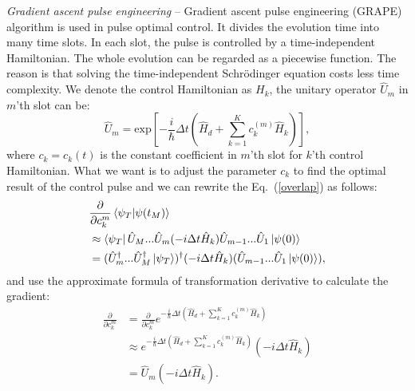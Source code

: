 \textit{Gradient ascent pulse engineering} -- Gradient ascent pulse engineering (GRAPE) algorithm is used in pulse optimal control. It divides the evolution time into many time slots. In each slot, the pulse is controlled by a time-independent Hamiltonian. The whole evolution can be regarded as a piecewise function. The reason is that solving the time-independent Schrödinger equation costs less time complexity. We denote the control Hamiltonian as $H_{k}$, the unitary operator $\hat{U}_{m}$ in $m$'th slot can be:
\begin{equation}
    \hat{U}_{m}=\mathrm{exp}\left[-\frac{i}{\hbar}\Delta t\left(\hat{H}_{d}+\sum_{k=1}^{K}c_{k}^{(m)}\hat{H}_{k}\right)\right],
\end{equation}
where $c_{k}=c_{k}(t)$ is the constant coefficient in $m$'th slot for $k$'th control Hamiltonian. What we want is to adjust the parameter $c_{k}$ to find the optimal result of the control pulse and we can rewrite the Eq.~(\ref{overlap}) as follows:
\begin{equation}
    \begin{aligned}
         & \frac{\partial}{\partial c_{k}^{m}}\braket{\psi_{T}|\psi(t_M)}                                                                             \\
         & \approx\bra{\psi_{T}}\hat{U}_{M}...\hat{U}_{m}(-i\Delta t\hat{H}_{k})\hat{U}_{m-1}...\hat{U}_{1}\ket{\psi(0)}                              \\
         & =(\hat{U}_{m}^{\dagger}...\hat{U}_{M}^{\dagger}\ket{\psi_{T}})^{\dagger}(-i\Delta t\hat{H}_{k})(\hat{U}_{m-1}...\hat{U}_{1}\ket{\psi(0)}),
    \end{aligned}
\end{equation}
and use the approximate formula of transformation derivative to calculate the gradient:
\begin{equation}
    \begin{aligned}
        \frac{\partial}{\partial c_{k}^{m}} & =\frac{\partial}{\partial c_{k}^{m}}e^{-\frac{i}{\hbar}\Delta t\left(\hat{H}_{d}+\sum_{k=1}^{K}c_{k}^{(m)}\hat{H}_{k}\right)} \\
                                            & \approx e^{-\frac{i}{\hbar}\Delta t\left(\hat{H}_{d}+\sum_{k=1}^{K}c_{k}^{(m)}\hat{H}_{k}\right)}(-i\Delta t\hat{H}_{k})      \\
                                            & =\hat{U}_{m}(-i\Delta t\hat{H}_{k}).
    \end{aligned}
\end{equation}
